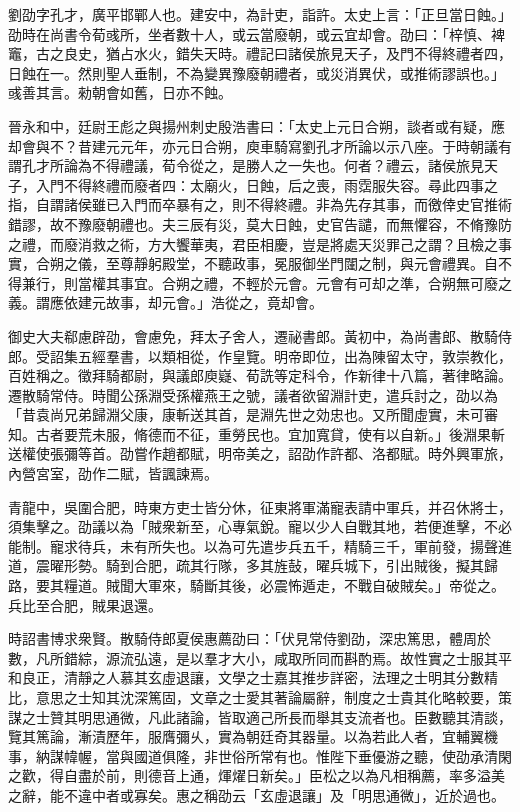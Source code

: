 
\begin{pinyinscope}
劉劭字孔才，廣平邯鄲人也。建安中，為計吏，詣許。太史上言：「正旦當日蝕。」劭時在尚書令荀彧所，坐者數十人，或云當廢朝，或云宜却會。劭曰：「梓慎、裨竈，古之良史，猶占水火，錯失天時。禮記曰諸侯旅見天子，及門不得終禮者四，日蝕在一。然則聖人垂制，不為變異豫廢朝禮者，或災消異伏，或推術謬誤也。」彧善其言。勑朝會如舊，日亦不蝕。

晉永和中，廷尉王彪之與揚州刺史殷浩書曰：「太史上元日合朔，談者或有疑，應却會與不？昔建元元年，亦元日合朔，庾車騎寫劉孔才所論以示八座。于時朝議有謂孔才所論為不得禮議，荀令從之，是勝人之一失也。何者？禮云，諸侯旅見天子，入門不得終禮而廢者四：太廟火，日蝕，后之喪，雨霑服失容。尋此四事之指，自謂諸侯雖已入門而卒暴有之，則不得終禮。非為先存其事，而徼倖史官推術錯謬，故不豫廢朝禮也。夫三辰有災，莫大日蝕，史官告譴，而無懼容，不脩豫防之禮，而廢消救之術，方大饗華夷，君臣相慶，豈是將處天災罪己之謂？且檢之事實，合朔之儀，至尊靜躬殿堂，不聽政事，冕服御坐門闥之制，與元會禮異。自不得兼行，則當權其事宜。合朔之禮，不輕於元會。元會有可却之準，合朔無可廢之義。謂應依建元故事，却元會。」浩從之，竟却會。

御史大夫郗慮辟劭，會慮免，拜太子舍人，遷祕書郎。黃初中，為尚書郎、散騎侍郎。受詔集五經羣書，以類相從，作皇覽。明帝即位，出為陳留太守，敦崇教化，百姓稱之。徵拜騎都尉，與議郎庾嶷、荀詵等定科令，作新律十八篇，著律略論。遷散騎常侍。時聞公孫淵受孫權燕王之號，議者欲留淵計吏，遣兵討之，劭以為「昔袁尚兄弟歸淵父康，康斬送其首，是淵先世之効忠也。又所聞虛實，未可審知。古者要荒未服，脩德而不征，重勞民也。宜加寬貸，使有以自新。」後淵果斬送權使張彌等首。劭嘗作趙都賦，明帝美之，詔劭作許都、洛都賦。時外興軍旅，內營宮室，劭作二賦，皆諷諫焉。

青龍中，吳圍合肥，時東方吏士皆分休，征東將軍滿寵表請中軍兵，并召休將士，須集擊之。劭議以為「賊衆新至，心專氣銳。寵以少人自戰其地，若便進擊，不必能制。寵求待兵，未有所失也。以為可先遣步兵五千，精騎三千，軍前發，揚聲進道，震曜形勢。騎到合肥，疏其行隊，多其旌鼔，曜兵城下，引出賊後，擬其歸路，要其糧道。賊聞大軍來，騎斷其後，必震怖遁走，不戰自破賊矣。」帝從之。兵比至合肥，賊果退還。

時詔書博求衆賢。散騎侍郎夏侯惠薦劭曰：「伏見常侍劉劭，深忠篤思，體周於數，凡所錯綜，源流弘遠，是以羣才大小，咸取所同而斟酌焉。故性實之士服其平和良正，清靜之人慕其玄虛退讓，文學之士嘉其推步詳密，法理之士明其分數精比，意思之士知其沈深篤固，文章之士愛其著論屬辭，制度之士貴其化略較要，策謀之士贊其明思通微，凡此諸論，皆取適己所長而舉其支流者也。臣數聽其清談，覽其篤論，漸漬歷年，服膺彌乆，實為朝廷奇其器量。以為若此人者，宜輔翼機事，納謀幃幄，當與國道俱隆，非世俗所常有也。惟陛下垂優游之聽，使劭承清閑之歡，得自盡於前，則德音上通，煇燿日新矣。」臣松之以為凡相稱薦，率多溢美之辭，能不違中者或寡矣。惠之稱劭云「玄虛退讓」及「明思通微」，近於過也。


\end{pinyinscope}
